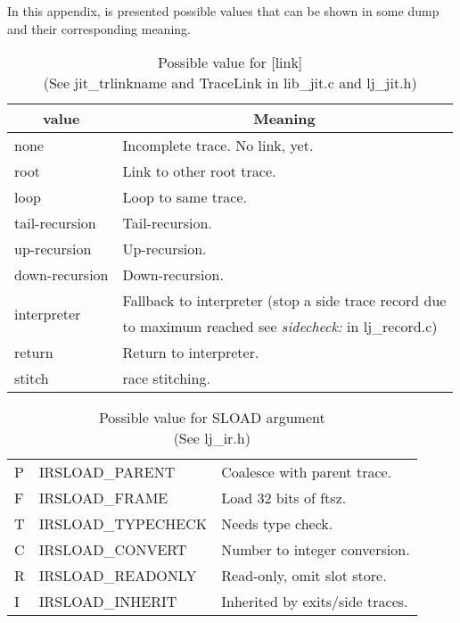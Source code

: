 
In this appendix, is presented possible values that can be shown in some dump
and their corresponding meaning.

\begin{table}[H]
\centering
\caption{
  Possible value for [link] \\(See jit\_trlinkname and TraceLink in lib\_jit.c
  and lj\_jit.h)
}
\label{tab:dump-link}
\begin{tabular}{|l|l|}
\hline
\multicolumn{1}{|c|}{value} & \multicolumn{1}{c|}{Meaning}\\\hline
none                        & Incomplete trace. No link, yet.\\
root                        & Link to other root trace.\\
loop                        & Loop to same trace.\\
tail-recursion              & Tail-recursion.\\
up-recursion                & Up-recursion.\\
down-recursion              & Down-recursion.\\\hline
\multirow{2}{*}{interpreter}& Fallback to interpreter (stop a side trace record due\\
& to maximum reached see \emph{sidecheck:} in lj\_record.c)\\\hline
return                      & Return to interpreter.\\
stitch                      & race stitching.\\\hline
\end{tabular}
\end{table}

\begin{table}[H]
\centering
\caption{
  Possible value for SLOAD argument \\(See lj\_ir.h)
}
\label{tab:dump-sload}
\begin{tabular}{|l|l|l|}
\hline
P & IRSLOAD\_PARENT    & Coalesce with parent trace.\\
F & IRSLOAD\_FRAME     & Load 32 bits of ftsz.\\
T & IRSLOAD\_TYPECHECK & Needs type check.\\
C & IRSLOAD\_CONVERT   & Number to integer conversion.\\
R & IRSLOAD\_READONLY  & Read-only, omit slot store.\\
I & IRSLOAD\_INHERIT   & Inherited by exits/side traces.\\
\hline
\end{tabular}
\end{table}

